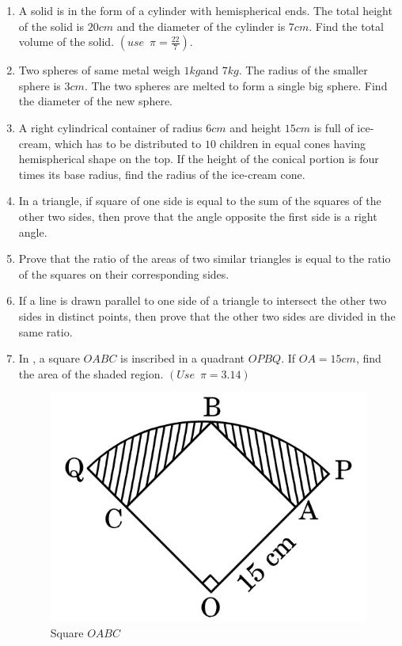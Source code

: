 \documentclass[2pt,-letter paper]{article}
\begin{document}
\begin{enumerate}
\item A solid is in the form of a cylinder with hemispherical ends. The total
height of the solid is $20 cm$ and the diameter of the cylinder is $7 cm$. Find the total volume of the solid. $(use \hspace{6pt}\pi = \frac{22}{7})$. 

\item Two spheres of same metal weigh $1 kg $and $7 kg$. The radius of the smaller sphere is $3 cm$. The two spheres are melted to form a single big sphere. Find the diameter of the new sphere.

\item A right cylindrical container of radius $6 cm$ and height $15 cm$ is full of ice-cream, which has to be distributed to $10$ children in equal cones having hemispherical shape on the top. If the height of the conical portion is four times its base radius, find the radius of the ice-cream cone.

\item In a triangle, if square of one side is equal to the sum of the squares of the other two sides, then prove that the angle opposite the first side is a right angle.

\item Prove that the ratio of the areas of two similar triangles is equal to the ratio of the squares on their corresponding sides.

\item If a line is drawn parallel to one side of a triangle to intersect the  other two sides in distinct points, then prove that the other two sides are divided in the same ratio.



\item In  , a square $OABC$ is inscribed in a quadrant $OPBQ$. If $OA = 15 cm$, find the area of the shaded region. $(Use \hspace{6pt}\pi = 3.14)$
\begin{figure}[H]
    \centering
    \includegraphics[width=\columnwidth]{img4.jpg}
    \caption{Square $OABC$}
    \label{fig:Fig_4}
\end{figure}


\end{enumerate}
\end{document}
